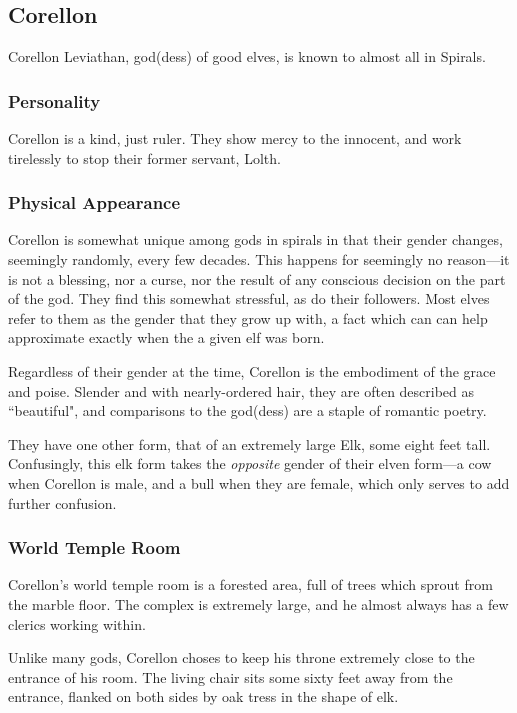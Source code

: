 \subsection*{Corellon}
\begin{goddesc}
\end{goddesc}
Corellon Leviathan, god(dess) of good elves, is known to almost all in Spirals.

\subsubsection*{Personality}
Corellon is a kind, just ruler.
They show mercy to the innocent, and work tirelessly to stop their former servant, Lolth.

\subsubsection*{Physical Appearance}
 Corellon is somewhat unique among gods in spirals in that their gender changes, seemingly randomly, every few decades.
This happens for seemingly no reason---it is not a blessing, nor a curse, nor the result of any conscious decision on the part of the god.
They find this somewhat stressful, as do their followers.
Most elves refer to them as the gender that they grow up with, a fact which can can help approximate exactly when the a given elf was born.

Regardless of their gender at the time, Corellon is the embodiment of the grace and poise.
Slender and with nearly-ordered hair, they are often described as ``beautiful", and comparisons to the god(dess) are a staple of romantic poetry.

They have one other form, that of an extremely large Elk, some eight feet tall.
Confusingly, this elk form takes the \textit{opposite} gender of their elven form---a cow when Corellon is male, and a bull when they are female, which only serves to add further confusion.
 
 \subsubsection*{World Temple Room}
Corellon's world temple room is a forested area, full of trees which sprout from the marble floor.
The complex is extremely large, and he almost always has a few clerics working within.
 
Unlike many gods, Corellon choses to keep his throne extremely close to the entrance of his room.
The living chair sits some sixty feet away from the entrance, flanked on both sides by oak tress in the shape of elk.

